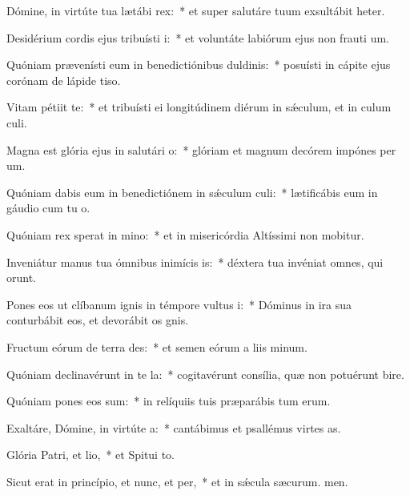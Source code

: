 \item Dómine, in virtúte tua lætábi rex:~* et super salutáre tuum exsultábit heter.
\item Desidérium cordis ejus tribuísti i:~* et voluntáte labiórum ejus non frauti um.
\item Quóniam prævenísti eum in benedictiónibus duldinis:~* posuísti in cápite ejus corónam de lápide tiso.
\item Vitam pétiit  te:~* et tribuísti ei longitúdinem diérum in sǽculum, et in culum culi.
\item Magna est glória ejus in salutári o:~* glóriam et magnum decórem impónes per um.
\item Quóniam dabis eum in benedictiónem in sǽculum culi:~* lætificábis eum in gáudio cum tu o.
\item Quóniam rex sperat in mino:~* et in misericórdia Altíssimi non mobitur.
\item Inveniátur manus tua ómnibus inimícis is:~* déxtera tua invéniat omnes, qui  orunt.
\item Pones eos ut clíbanum ignis in témpore vultus i:~* Dóminus in ira sua conturbábit eos, et devorábit os gnis.
\item Fructum eórum de terra des:~* et semen eórum a liis minum.
\item Quóniam declinavérunt in te la:~* cogitavérunt consília, quæ non potuérunt bire.
\item Quóniam pones eos sum:~* in relíquiis tuis præparábis tum erum.
\item Exaltáre, Dómine, in virtúte a:~* cantábimus et psallémus virtes as.
\item Glória Patri, et lio,~* et Spitui to.
\item Sicut erat in princípio, et nunc, et per,~* et in sǽcula sæcurum. men.
